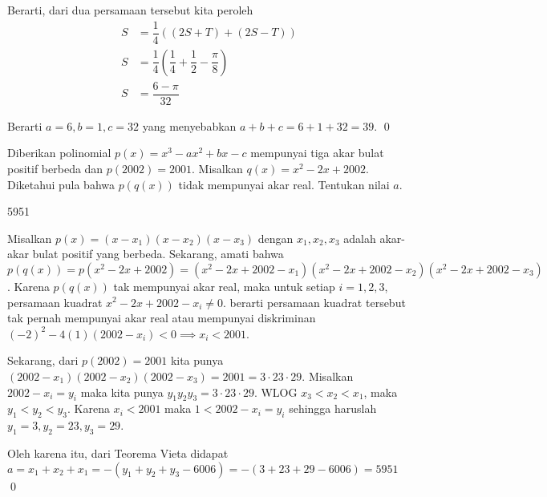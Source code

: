 \documentclass[11pt]{scrartcl}
\begin{document}
\begin{soalbaru}
\begin{solusi}
			Berarti, dari dua persamaan tersebut kita peroleh
			\begin{equation*}
			\begin{split}
			S &= \dfrac{1}{4}\left((2S+T)+(2S-T)\right)\\
			S&= \dfrac{1}{4}\left(\dfrac{1}{4}+\dfrac{1}{2}-\dfrac{\pi}{8}\right)\\
			S&=\dfrac{6-\pi}{32}
			\end{split}
			\end{equation*}
			
			Berarti $a=6,b=1,c=32$ yang menyebabkan $a+b+c=6+1+32=39$. \qed
			\end{solusi}
		\end{soalbaru}
	
	\begin{soalbaru}
		Diberikan polinomial $p(x)=x^3-ax^2+bx-c$ mempunyai tiga akar bulat positif berbeda dan $p(2002)=2001$. Misalkan $q(x)=x^2-2x+2002$. Diketahui pula bahwa $p(q(x))$ tidak mempunyai akar real. Tentukan nilai $a$.
		
		\begin{jawaban}
		5951
		\end{jawaban}
		\begin{solusi}
					Misalkan $p(x)=(x-x_1)(x-x_2)(x-x_3)$ dengan $x_1,x_2,x_3$ adalah akar-akar bulat positif yang berbeda.  Sekarang, amati bahwa $p(q(x))=p(x^2-2x+2002)=(x^2-2x+2002-x_1)(x^2-2x+2002-x_2)(x^2-2x+2002-x_3)$. Karena $p(q(x))$ tak mempunyai akar real, maka  untuk setiap $i=1,2,3$, persamaan kuadrat $x^2-2x+2002-x_i \neq 0$. berarti persamaan kuadrat tersebut tak pernah mempunyai akar real atau mempunyai diskriminan $(-2)^2-4(1)(2002-x_i) < 0 \implies x_i < 2001$.
					
					Sekarang, dari $p(2002)=2001$ kita punya $(2002-x_1)(2002-x_2)(2002-x_3)=2001=3\cdot 23 \cdot 29$.  Misalkan $2002-x_i = y_i$ maka kita punya $y_1y_2y_3=3 \cdot 23 \cdot 29$. WLOG $x_3 < x_2 < x_1$, maka $y_1 < y_2<y_3$. Karena $x_i < 2001$ maka $1 < 2002 - x_i = y_i$ sehingga haruslah $y_1 = 3, y_2=23, y_3=29$.
					
					Oleh karena itu, dari Teorema Vieta didapat $a=x_1+x_2+x_1=-(y_1+y_2+y_3-6006)=-(3+23+29-6006)=5951$ \qed
		\end{solusi}
	\end{soalbaru}
	\newpage
\end{document}
